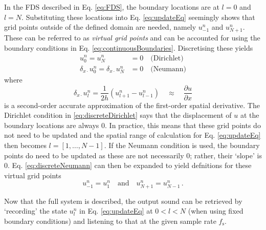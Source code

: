 In the FDS described in Eq. \eqref{eq:FDS}, the boundary locations are at $l = 0$ and $l = N$. Substituting these locations into Eq. \eqref{eq:updateEq} seemingly shows that grid points outside of the defined domain are needed, namely $u_{-1}^n$ and $u_{N+1}^n$. These can be referred to as \textit{virtual grid points} and can be accounted for using the boundary conditions in Eq. \eqref{eq:continuousBoundaries}. Discretising these yields
\begin{subequations}
    \begin{align}
        u_0^n = u_N^n &= 0 \quad\text{(Dirichlet)}\label{eq:discreteDirichlet}\\
        \delta_{x\cdot} u_0^n = \delta_{x\cdot} u_N^n &= 0 \quad \text{(Neumann)}\label{eq:discreteNeumann}
    \end{align}
\end{subequations}
where 
\begin{equation}
    \delta_{x\cdot}u_l^n = \frac{1}{2h}\left(u_{l+1}^n - u_{l-1}^n\right)\quad \approx\quad \frac{\partial u}{\partial x}
\end{equation}
is a second-order accurate approximation of the first-order spatial derivative. The Dirichlet condition in \eqref{eq:discreteDirichlet} says that the displacement of $u$ at the boundary locations are always 0. In practice, this means that these grid points do not need to be updated and the spatial range of calculation for Eq. \eqref{eq:updateEq} then becomes $l = [1, \hdots, N-1]$. If the Neumann condition is used, the boundary points do need to be updated as these are not necessarily $0$; rather, their `slope' is $0$. Eq. \eqref{eq:discreteNeumann} can then be expanded to yield defnitions for these virtual grid points
\begin{equation}\label{eq:neumannSolution}
    u_{-1}^n = u_1^n \quad \text{and} \quad u_{N+1}^n = u_{N-1}^n\,.
\end{equation}

Now that the full system is described, the output sound can be retrieved by `recording' the state $u_l^n$ in Eq. \eqref{eq:updateEq} at $0 < l < N$ (when using fixed boundary conditions) and listening to that at the given sample rate $f_\text{s}$. %

